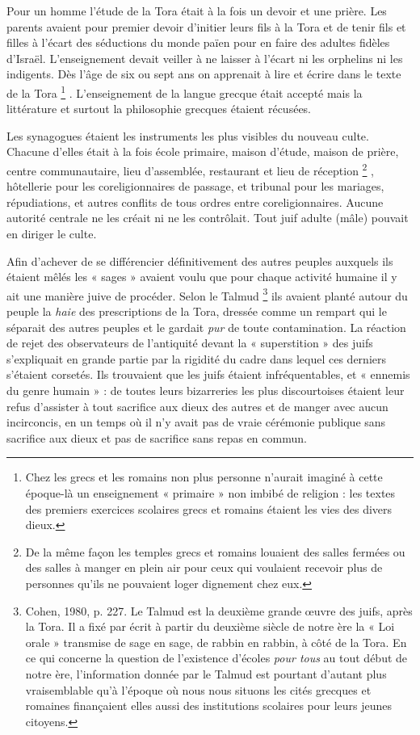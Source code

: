  Pour un homme l'étude de la Tora était à la fois un devoir et une prière. Les parents avaient pour premier devoir d'initier leurs fils à la Tora et de tenir fils et filles à l'écart des séductions du monde païen pour en faire des adultes fidèles d'Israël. L'enseignement devait veiller à ne laisser à l'écart ni les orphelins ni les indigents. Dès l'âge de six ou sept ans on apprenait à lire et écrire dans le texte de la Tora%
\footnote{Chez les grecs et les romains non plus personne n'aurait imaginé à cette époque-là un enseignement « primaire » non imbibé de religion : les textes des premiers exercices scolaires grecs et romains étaient les vies des divers dieux.}%
. L'enseignement de la langue grecque était accepté mais la littérature et surtout la philosophie grecques étaient récusées. 

 Les synagogues étaient les instruments les plus visibles du nouveau culte. Chacune d'elles était à la fois école primaire, maison d'étude, maison de prière, centre communautaire, lieu d'assemblée, restaurant et lieu de réception%
\footnote{De la même façon les temples grecs et romains louaient des salles fermées ou des salles à manger en plein air pour ceux qui voulaient recevoir plus de personnes qu'ils ne pouvaient loger dignement chez eux.}%
, hôtellerie pour les coreligionnaires de passage, et tribunal pour les mariages, répudiations, et autres conflits de tous ordres entre coreligionnaires. Aucune autorité centrale ne les créait ni ne les contrôlait. Tout juif adulte (mâle) pouvait en diriger le culte.

 Afin d'achever de se différencier définitivement des autres peuples auxquels ils étaient mêlés les « sages » avaient voulu que pour chaque activité humaine il y ait une manière juive de procéder. Selon le Talmud%
\footnote{Cohen, 1980, p. 227. Le Talmud est la deuxième grande œuvre des juifs, après la Tora. Il a fixé par écrit à partir du deuxième siècle de notre ère la « Loi orale » transmise de sage en sage, de rabbin en rabbin, à côté de la Tora. En ce qui concerne la question de l'existence d'écoles \emph{pour tous} au tout début de notre ère, l'information donnée par le Talmud est pourtant d'autant plus vraisemblable qu'à l'époque où nous nous situons les cités grecques et romaines finançaient elles aussi des institutions scolaires pour leurs jeunes citoyens.}
ils avaient planté autour du peuple la \emph{haie} des prescriptions de la Tora, dressée comme un rempart qui le séparait des autres peuples et le gardait \emph{pur} de toute contamination. La réaction de rejet des observateurs de l'antiquité devant la « superstition » des juifs s'expliquait en grande partie par la rigidité du cadre dans lequel ces derniers s'étaient corsetés. Ils trouvaient que les juifs étaient infréquentables, et « ennemis du genre humain » : de toutes leurs bizarreries les plus discourtoises étaient leur refus d'assister à tout sacrifice aux dieux des autres et de manger avec aucun incirconcis, en un temps où il n'y avait pas de vraie cérémonie publique sans sacrifice aux dieux et pas de sacrifice sans repas en commun. 

